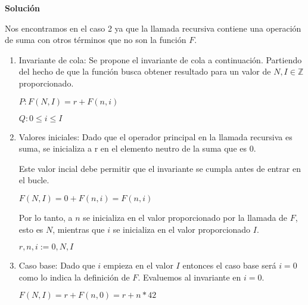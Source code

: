 \documentclass[hidelinks]{article}
\begin{document}
\textbf{Solución}\par

Nos encontramos en el caso 2 ya que la llamada recursiva contiene una operación
de suma con otros términos que no son la función $F$.\par

\begin{enumerate}
	\item Invariante de cola: Se propone el invariante de cola a continuación. Partiendo
	      del hecho de que la función busca obtener resultado para un valor de $N,I \in
		      \mathbb{Z}$ proporcionado.\par
	      \begin{center}
		      $P: F(N,I) = r + F(n,i)$\par
		      $Q: 0 \leq i \leq I$\par
	      \end{center}
	\item Valores iniciales: Dado que el operador principal en la llamada recursiva es
	      suma, se inicializa a r en el elemento neutro de la suma que es 0.\par
	      Este valor incial debe permitir que el invariante se cumpla antes de entrar en
	      el bucle.\par
	      $F(N,I) = 0 + F(n,i) = F(n,i)$\par
	      Por lo tanto, a $n$ se inicializa en el valor proporcionado por la llamada de
	      $F$, esto es $N$, mientras que $i$ se inicializa en el valor proporcionado $I$.
	      \begin{center}
		      $r,n,i := 0,N,I$\par
	      \end{center}
	\item Caso base: Dado que $i$ empieza en el valor $I$ entonces el caso base será $i =
		      0$ como lo indica la definición de $F$. Evaluemos al invariante en $i = 0$.\par
	      $F(N,I) = r + F(n,0) = r + n * 42$\par


\end{enumerate}
\end{document}
